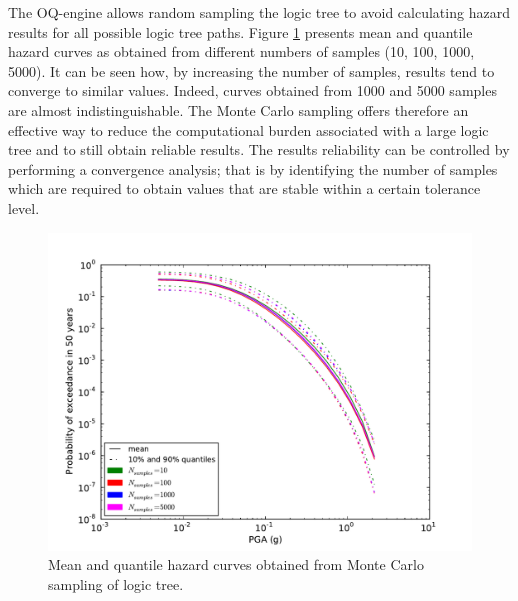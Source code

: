 The OQ-engine allows random sampling the logic tree to avoid calculating hazard results for all possible
logic tree paths. Figure \ref{fig:logic_tree_curves} presents mean and quantile hazard curves
as obtained from different numbers of samples (10, 100, 1000, 5000). It can be seen how, by increasing the number
of samples, results tend to converge to similar values. Indeed, curves obtained from 1000 and 5000 samples are almost indistinguishable. The Monte Carlo sampling offers therefore an effective way to reduce the computational burden associated with a large logic tree and to still obtain reliable results. The results reliability can be controlled by performing a convergence analysis; that is by identifying the number of samples
which are required to obtain values that are stable within a certain tolerance level.
\begin{figure}
\centering
\includegraphics[width=14cm]{./Pictures/LogicTreeCurves.pdf}
\caption{Mean and quantile hazard curves obtained from Monte Carlo sampling of logic tree.}
\label{fig:logic_tree_curves}
\end{figure}

